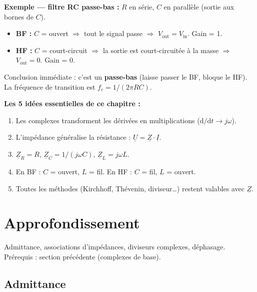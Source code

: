 \documentclass[12pt,a4paper,twoside]{book}
\begin{document}
\begin{pratique}
\textbf{Exemple --- filtre RC passe-bas :} $R$ en série, $C$ en parallèle (sortie aux bornes de $C$).
\begin{itemize}[nosep]
\item \textbf{BF :} $C$ = ouvert $\Rightarrow$ tout le signal passe $\Rightarrow$ $V_{\text{out}} = V_{\text{in}}$. Gain = 1.
\item \textbf{HF :} $C$ = court-circuit $\Rightarrow$ la sortie est court-circuitée à la masse $\Rightarrow$ $V_{\text{out}} = 0$. Gain = 0.
\end{itemize}
Conclusion immédiate : c'est un \textbf{passe-bas} (laisse passer le BF, bloque le HF). La fréquence de transition est $f_c = 1/(2\pi RC)$.
\end{pratique}

\begin{retenir}
\textbf{Les 5 idées essentielles de ce chapitre :}
\begin{enumerate}[nosep]
\item Les complexes transforment les dérivées en multiplications ($\mathrm{d}/\mathrm{d}t \to j\omega$).
\item L'impédance généralise la résistance : $\underline{U} = \underline{Z}\cdot\underline{I}$.
\item $\underline{Z}_R = R$, \quad $\underline{Z}_C = 1/(j\omega C)$, \quad $\underline{Z}_L = j\omega L$.
\item En BF : $C$ = ouvert, $L$ = fil. En HF : $C$ = fil, $L$ = ouvert.
\item Toutes les méthodes (Kirchhoff, Thévenin, diviseur\ldots) restent valables avec $\underline{Z}$.
\end{enumerate}
\end{retenir}

\section{Approfondissement}

\begin{approfondissement}
Admittance, associations d'impédances, diviseurs complexes, déphasage. Prérequis : section précédente (complexes de base).
\end{approfondissement}

\subsection{Admittance}
\end{document}

